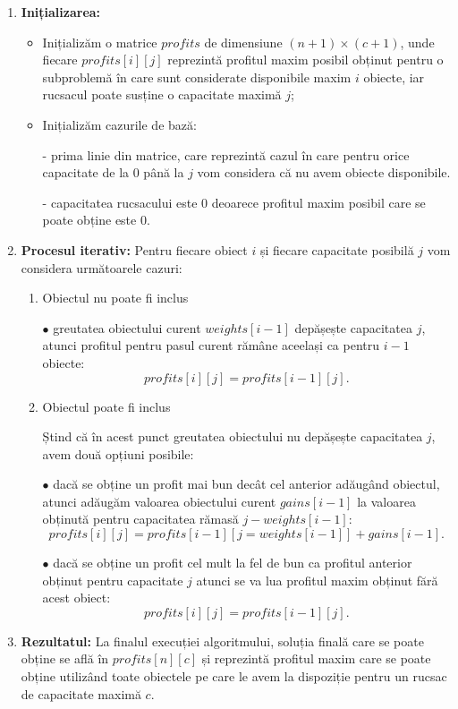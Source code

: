 \begin{tcolorbox}[mystyle]
\begin{enumerate}[left=0.2em]
    \item \textbf{Inițializarea:}
    \begin{itemize}
        \item Inițializăm o matrice \(profits\) de dimensiune \((n + 1) \times (c + 1)\), unde fiecare \( profits[i][j]\) reprezintă profitul maxim posibil obținut pentru o subproblemă în care sunt considerate disponibile maxim \(i\) obiecte, iar rucsacul poate susține o capacitate maximă \(j\);
        \item Inițializăm cazurile de bază:
        \par - prima linie din matrice, care reprezintă cazul în care pentru orice capacitate de la \(0\) până la \(j\) vom considera că nu avem obiecte disponibile. 
        \par - capacitatea rucsacului este \(0\) deoarece profitul maxim posibil care se poate obține este \(0\).
    \end{itemize}
    \item \textbf{Procesul iterativ:}
    Pentru fiecare obiect \(i\) și fiecare capacitate posibilă \(j\) vom considera următoarele cazuri:
    \begin{enumerate}
        \item Obiectul nu poate fi inclus \par
            $\bullet$ greutatea obiectului curent \(weights[i - 1]\) depășește capacitatea \(j\), atunci profitul pentru pasul curent rămâne aceelași ca pentru \(i - 1\) obiecte: \[profits[i][j] = profits[i - 1][j].\]
        \item Obiectul poate fi inclus \par
        Ștind că în acest punct greutatea obiectului nu depășește capacitatea \(j\), avem două opțiuni posibile: \par
        $\bullet$ dacă se obține un profit mai bun decât cel anterior adăugând obiectul, atunci adăugăm valoarea obiectului curent \(gains[i - 1]\) la valoarea obținută pentru capacitatea rămasă \(j - weights[i - 1]\): \[profits[i][j] = profits[i - 1][j = weights[i - 1]] + gains[i - 1].\] \par
        $\bullet$ dacă se obține un profit cel mult la fel de bun ca profitul anterior obținut pentru capacitate \(j\) atunci se va lua profitul maxim obținut fără acest obiect: \[profits[i][j] = profits[i - 1][j].\] 
    \end{enumerate}
    \item \textbf{Rezultatul:}
    La finalul execuției algoritmului, soluția finală care se poate obține se află în \(profits[n][c]\) și reprezintă profitul maxim care se poate obține utilizând toate obiectele pe care le avem la dispoziție pentru un rucsac de capacitate maximă \(c\).
\end{enumerate}
\end{tcolorbox}

